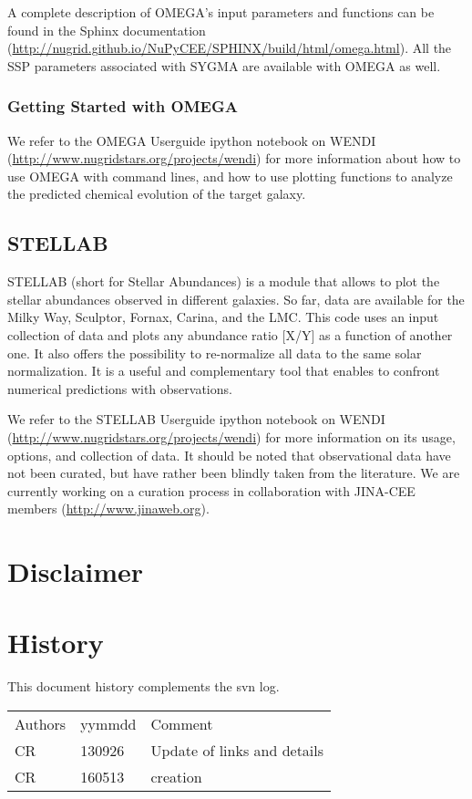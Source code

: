 A complete description of OMEGA's input parameters and functions can
be found in the Sphinx documentation (\url{http://nugrid.github.io/NuPyCEE/SPHINX/build/html/omega.html}). 
All the SSP parameters associated with SYGMA are available with OMEGA as well.

\subsubsection{Getting Started with OMEGA}

We refer to the OMEGA Userguide ipython notebook on WENDI (\url{http://www.nugridstars.org/projects/wendi})
for more information about how to use OMEGA with command lines, and how to use plotting functions
to analyze the predicted chemical evolution of the target galaxy.


\subsection{STELLAB}

STELLAB (short for Stellar Abundances) is a module that allows to plot the stellar abundances 
observed in different galaxies.  So far, data are available for the Milky Way, Sculptor, Fornax, Carina,
and the LMC.  This code uses an input collection of data and plots any abundance ratio [X/Y] as 
a function of another one.  It also offers the possibility to re-normalize all data to the same solar
normalization.  It is a useful and complementary tool that enables to confront numerical predictions
with observations.

We refer to the STELLAB Userguide ipython notebook on WENDI (\url{http://www.nugridstars.org/projects/wendi})
for more information on its usage, options, and collection of data.  It should be noted that observational
data have not been curated, but have rather been blindly taken from the literature.  We are currently
working on a curation process in collaboration with JINA-CEE members (\url{http://www.jinaweb.org}).

\section{Disclaimer}

		
\section{History} 
This document history complements the svn log.

\begin{tabular*}{\textwidth}{lll}
\hline
Authors & yymmdd & Comment \\
CR & 130926 & Update of links and details \\
\hline
CR & 160513 & creation \\
\end{tabular*}


